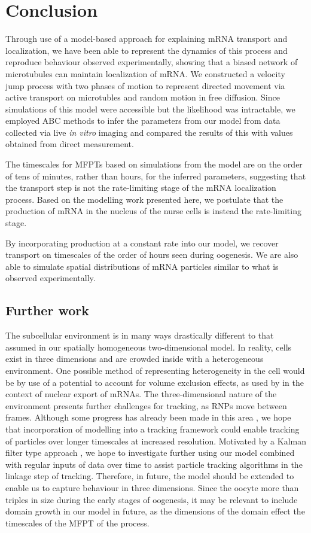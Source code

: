 \documentclass[twocolumn]{biophys}
\newlength\tindent
\renewcommand{\indent}{\hspace*{\tindent}}
\begin{document}
\section{Conclusion} \label{Conclusions}
Through use of a model-based approach for explaining mRNA transport and localization, we have been able to represent the dynamics of this process and reproduce behaviour observed experimentally, showing that a biased network of microtubules can maintain localization of mRNA.
We constructed a velocity jump process with two phases of motion to represent directed movement via active transport on microtubles and random motion in free diffusion.
Since simulations of this model were accessible but the likelihood was intractable, we employed ABC methods to infer the parameters from our model from data collected via live \textit{in vitro} imaging and compared the results of this with values obtained from direct measurement.

\indent The timescales for MFPTs based on simulations from the model are on the order of tens of minutes, rather than hours, for the inferred parameters, suggesting that the transport step is not the rate-limiting stage of the mRNA localization process.
Based on the modelling work presented here, we postulate that the production of mRNA in the nucleus of the nurse cells is instead the rate-limiting stage.

\indent By incorporating production at a constant rate into our model, we recover transport on timescales of the order of hours seen during oogenesis.
We are also able to simulate spatial distributions of mRNA particles similar to what is observed experimentally.  

\subsection{Further work}
The subcellular environment is in many ways drastically different to that assumed in our spatially homogeneous two-dimensional model.
In reality, cells exist in three dimensions and are crowded inside with a heterogeneous environment. 
One possible method of representing heterogeneity in the cell would be by use of a potential to account for volume exclusion effects, as used by \citet{isaacson2011influence} in the context of nuclear export of mRNAs.
The three-dimensional nature of the environment presents further challenges for tracking, as RNPs move between frames.
Although some progress has already been made in this area \citep{thompson2010three}, we hope that incorporation of modelling into a tracking framework could enable tracking of particles over longer timescales at increased resolution. 
Motivated by a Kalman filter type approach \citep{faragher2012understanding}, we hope to investigate further using our model combined with regular inputs of data over time to assist particle tracking algorithms in the linkage step of tracking.
Therefore, in future, the model should be extended to enable us to capture behaviour in three dimensions. 
Since the oocyte more than triples in size during the early stages of oogenesis, it may be relevant to include domain growth in our model in future, as the dimensions of the domain effect the timescales of the MFPT of the process.
\end{document}
